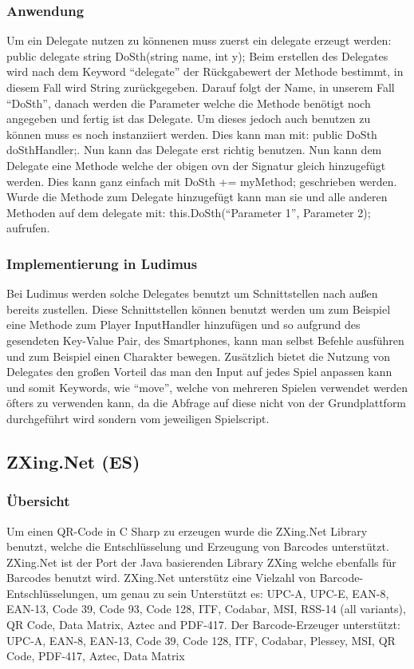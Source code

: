 \subsubsection{Anwendung}
Um ein Delegate nutzen zu könnenen muss zuerst ein delegate erzeugt werden:
\newline
\tab public delegate string DoSth(string name, int y);
\newline
Beim erstellen des Delegates wird nach dem Keyword “delegate” der Rückgabewert der Methode bestimmt, in diesem Fall wird String zurückgegeben. Darauf folgt der Name, in unserem Fall “DoSth”, danach werden die Parameter welche die Methode benötigt noch angegeben und fertig ist das Delegate. Um dieses jedoch auch benutzen zu können muss es noch instanziiert werden. Dies kann man mit: public DoSth doSthHandler;. Nun kann das Delegate erst richtig benutzen. Nun kann dem Delegate eine Methode welche der obigen ovn der Signatur gleich hinzugefügt werden. Dies kann ganz einfach mit DoSth += myMethod; geschrieben werden. Wurde die Methode zum Delegate hinzugefügt kann man sie und alle anderen Methoden auf dem delegate mit: this.DoSth(“Parameter 1”, Parameter 2); aufrufen.
\subsubsection{Implementierung in Ludimus}
Bei Ludimus werden solche Delegates benutzt um Schnittstellen nach außen bereits zustellen. Diese Schnittstellen können benutzt werden um zum Beispiel eine Methode zum Player InputHandler hinzufügen und so aufgrund des gesendeten Key-Value Pair, des Smartphones, kann man selbst Befehle ausführen und zum Beispiel einen Charakter bewegen. Zusätzlich bietet die Nutzung von Delegates den großen Vorteil das man den Input auf jedes Spiel anpassen kann und somit Keywords, wie “move”, welche von mehreren Spielen verwendet werden öfters zu verwenden kann, da die Abfrage auf diese nicht von der Grundplattform durchgeführt wird sondern vom jeweiligen Spielscript.
\subsection{ZXing.Net (ES)}
\subsubsection{Übersicht}
Um einen QR-Code in C Sharp zu erzeugen wurde die ZXing.Net Library benutzt, welche die Entschlüsselung und Erzeugung von Barcodes unterstützt. ZXing.Net ist der Port der Java basierenden Library ZXing welche ebenfalls für Barcodes benutzt wird.
\newline \newline
ZXing.Net unterstütz eine Vielzahl von Barcode-Entschlüsselungen, um genau zu sein Unterstützt es: UPC-A, UPC-E, EAN-8, EAN-13, Code 39, Code 93, Code 128, ITF, Codabar, MSI, RSS-14 (all variants), QR Code, Data Matrix, Aztec and PDF-417.
\newline \newline
Der Barcode-Erzeuger unterstützt: UPC-A, EAN-8, EAN-13, Code 39, Code 128, ITF, Codabar, Plessey, MSI, QR Code, PDF-417, Aztec, Data Matrix
